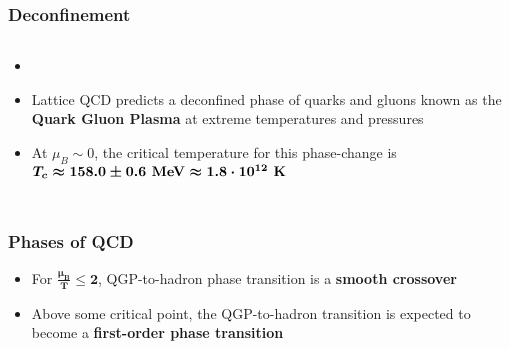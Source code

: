 \documentclass[9pt]{beamer}
\begin{document}
     \begin{frame}
       \frametitle{\textbf{Deconfinement}}
       \begin{columns}
         \begin{itemize}
         \item 
         \item Lattice QCD predicts a deconfined phase of quarks and gluons known as the \textbf{Quark Gluon Plasma} at extreme temperatures and pressures
         \item At $\mu_B \sim 0$, the critical temperature for this phase-change is $\boldmath{T_c \approx 158.0 \pm 0.6 \textbf{ MeV} \approx 1.8 \cdot 10^{12} \textbf{ K}}$
         \end{itemize}
       \end{columns}
     \end{frame}

     \begin{frame}
       \frametitle{\textbf{Phases of QCD}}
       \begin{itemize}
       \item For $\mathbf{\frac{\mu_B}{T} \leq 2}$, QGP-to-hadron phase transition is a \textbf{smooth crossover}
       \item Above some critical point, the QGP-to-hadron transition is expected to become a \textbf{first-order phase transition}
       \end{itemize}

       \

       \centering
     \end{frame}
\end{document}
